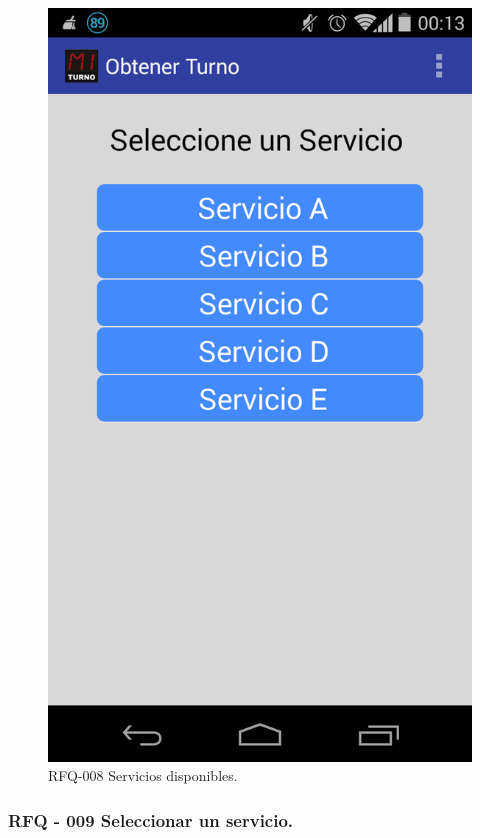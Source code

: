 \begin{figure}[H]
\centering
\includegraphics[scale=0.20]{images/capitulo6/rfq008.png}
\caption{RFQ-008 Servicios disponibles.}
\label{rfq008}
\end{figure}

\subsubsection{RFQ - 009 Seleccionar un servicio.}

